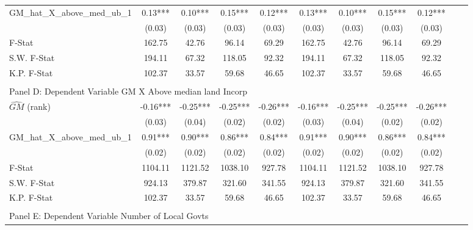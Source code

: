 \begin{table}[htbp]
\begin{threeparttable}
\begin{tabular}{l*{10}{c}}
\addlinespace
GM\_hat\_X\_above\_med\_ub\_1&       0.13***&       0.10***&       0.15***&       0.12***&       0.13***&       0.10***&       0.15***&       0.12***\\
                &     (0.03)   &     (0.03)   &     (0.03)   &     (0.03)   &     (0.03)   &     (0.03)   &     (0.03)   &     (0.03)   \\
\midrule
F-Stat          &     162.75   &      42.76   &      96.14   &      69.29   &     162.75   &      42.76   &      96.14   &      69.29   \\
S.W. F-Stat     &     194.11   &      67.32   &     118.05   &      92.32   &     194.11   &      67.32   &     118.05   &      92.32   \\
K.P. F-Stat     &     102.37   &      33.57   &      59.68   &      46.65   &     102.37   &      33.57   &      59.68   &      46.65   \\
\cmidrule[\heavyrulewidth](lr){1-9} \\ \cmidrule[\heavyrulewidth](lr){1-9}
\multicolumn{8}{l}{Panel D: Dependent Variable GM X Above median land Incorp}\\
\cmidrule(lr){1-9}
$\hat{GM}$ (rank)&      -0.16***&      -0.25***&      -0.25***&      -0.26***&      -0.16***&      -0.25***&      -0.25***&      -0.26***\\
                &     (0.03)   &     (0.04)   &     (0.02)   &     (0.02)   &     (0.03)   &     (0.04)   &     (0.02)   &     (0.02)   \\
\addlinespace
GM\_hat\_X\_above\_med\_ub\_1&       0.91***&       0.90***&       0.86***&       0.84***&       0.91***&       0.90***&       0.86***&       0.84***\\
                &     (0.02)   &     (0.02)   &     (0.02)   &     (0.02)   &     (0.02)   &     (0.02)   &     (0.02)   &     (0.02)   \\
\midrule
F-Stat          &    1104.11   &    1121.52   &    1038.10   &     927.78   &    1104.11   &    1121.52   &    1038.10   &     927.78   \\
S.W. F-Stat     &     924.13   &     379.87   &     321.60   &     341.55   &     924.13   &     379.87   &     321.60   &     341.55   \\
K.P. F-Stat     &     102.37   &      33.57   &      59.68   &      46.65   &     102.37   &      33.57   &      59.68   &      46.65   \\
\cmidrule[\heavyrulewidth](lr){1-9} \\ \cmidrule[\heavyrulewidth](lr){1-9}
\multicolumn{8}{l}{Panel E: Dependent Variable Number of Local Govts}\\

\end{tabular}
\end{threeparttable}
\end{table}
